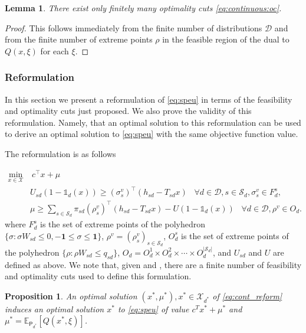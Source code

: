 \documentclass[12pt]{article}
\newtheorem{proposition}[theorem]{Proposition}%
\newtheorem{lemma}[theorem]{Lemma}%
\theoremstyle{thmstylethree}%
\newcommand{\mtc}[1] {\mathcal{#1}}
\newcommand{\pr}[1]{\ensuremath{\mathsf{#1}}}
\def\Ex{\ensuremath{\mathbb{E}}}
\def\Ind{\ensuremath{\mathbb{1}}}
\begin{document}
    
\begin{lemma}\label{prop:oc:continuous:finite}
 There exist only finitely many optimality cuts \eqref{eq:continuous:oc}.
\end{lemma}
\begin{proof}
This follows immediately from the finite number of distributions $\mtc{D}$ and from the finite number of extreme points $\rho$ in the feasible region of the dual to $Q(x,\xi)$ for each $\xi$.
\end{proof}

\subsubsection{Reformulation}
In this section we present a reformulation of \eqref{eq:speu} in terms of the feasibility and optimality cuts just proposed. We also prove the validity of this reformulation. Namely, that an optimal solution to this reformulation can be used to derive an optimal solution to \eqref{eq:speu} with the same objective function value.

The reformulation is as follows 

\begin{align}\label{eq:cont_reform}
     \min_{x\in \mtc{X}}&  ~c^\top x+\mu  \\
     &U_{sd}(1-\Ind_{d}(x)) \geq  (\sigma^v_s)^\top(h_{sd}-T_{sd}x)   \;\;\; \forall d \in \mtc{D}, s \in \mathcal{S}_{d}, \sigma^{v}_s \in F_{d}^{s}, \nonumber \\
	 &\mu\geq  \sum_{s\in\mtc{S}_{d}}\pi_{sd}(\rho_s^v)^\top (h_{sd}-T_{sd}x) - U(1-\Ind_{d}(x)) \;\;\; \forall d \in \mtc{D}, \rho^{v} \in O_{d} \nonumber.
\end{align}
where $F_{d}^{s}$ is the set of extreme points of the polyhedron $\{\sigma: \sigma W_{sd} \leq 0, \mathbf{-1} \leq \sigma \leq \mathbf{1} \}$,
$\rho^v=(\rho_s^v)_{s\in\mtc{S}_d}$, $O_{d}^{s}$ is the set of extreme points of the polyhedron $\{\rho: \rho W_{sd} \leq q_{sd}\}$, $O_d=O_d^1\times O_d^2 \times \cdots \times O_d^{\vert\mtc{S}_d\vert}$, and $U_{sd}$ and $U$ are defined as above. 
We note that, given  and , there are a finite number of feasibility and optimality cuts used to define this formulation. %


\begin{proposition}\label{prop:equivalent_reform}
An optimal solution $(x^*,\mu^*), x^* \in \mathcal{X}_{d^*}$ of \eqref{eq:cont_reform} induces an optimal solution $x^*$ to \eqref{eq:speu} of value $c^{T}x^* + \mu^*$ and $\mu^*=\Ex_{\pr{P}_{d^*}}[Q(x^*,\xi)]$. 
\end{proposition}
\end{document}
